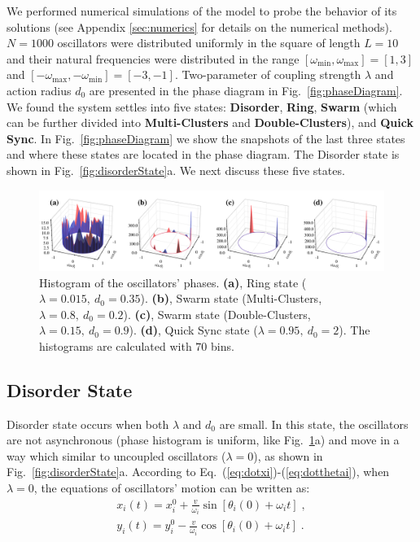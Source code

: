 \documentclass[%
 aip,
 amsmath,amssymb,
 reprint,%
]{revtex4-1}
\begin{document}
We performed numerical simulations of the model to probe the behavior of its solutions (see Appendix \ref{sec:numerics} for details on the numerical methods). 
$N=1000$ oscillators were distributed uniformly in the square of length $L=10$ and their natural frequencies were distributed in the range $\left[ \omega _{\min},\omega _{\max} \right]=\left[ 1,3 \right]$ and $\left[ -\omega _{\max},-\omega _{\min} \right]=\left[ -3,-1 \right]$.
Two-parameter of coupling strength $\lambda$ and action radius $d_0$ are presented in the phase diagram in Fig.~\ref{fig:phaseDiagram}. We found the system settles into five states: \textbf{Disorder}, \textbf{Ring}, \textbf{Swarm} (which can be further divided into \textbf{Multi-Clusters} and \textbf{Double-Clusters}), and \textbf{Quick Sync}. In Fig.~\ref{fig:phaseDiagram} we show the snapshots of the last three states and where these states are located in the phase diagram. The Disorder state is shown in Fig.~\ref{fig:disorderState}a.
We next discuss these five states.

\begin{figure}
    \includegraphics[width=\textwidth]{./figs/phaseHist.pdf}
    \caption{
        \label{fig:phaseHist} Histogram of the oscillators' phases.
        \textbf{(a)}, Ring state ($\lambda=0.015,\ d_0=0.35$).
        \textbf{(b)}, Swarm state (Multi-Clusters, $\lambda=0.8,\ d_0=0.2$).
        \textbf{(c)}, Swarm state (Double-Clusters, $\lambda=0.15,\ d_0=0.9$).
        \textbf{(d)}, Quick Sync state ($\lambda=0.95,\ d_0=2$). The histograms are calculated with $70$ bins.
    }
\end{figure}



\subsection{Disorder State}

Disorder state occurs when both $\lambda$ and $d_0$ are small. In this state, the oscillators are not asynchronous (phase histogram is uniform, like Fig.~\ref{fig:phaseHist}a) and move in a way which similar to uncoupled oscillators ($\lambda=0$), as shown in Fig.~\ref{fig:disorderState}a. According to Eq.~(\ref{eq:dotxi})-(\ref{eq:dotthetai}), when $\lambda=0$, the equations of oscillators' motion can be written as:
\begin{eqnarray}
    x_i\left( t \right) =x_{i}^{0}+\frac{v}{\omega _i}\sin \left[ \theta _i\left( 0 \right) +\omega _it \right] \;,\label{eq:circlemotionx}\\
    y_i\left( t \right) =y_{i}^{0}-\frac{v}{\omega _i}\cos \left[ \theta _i\left( 0 \right) +\omega _it \right] \;.
\end{eqnarray}
\end{document}
